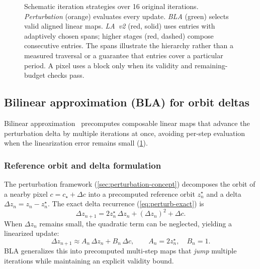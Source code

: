 \begin{figure}[!htbp]
{%
}%
\caption[Iteration skipping: perturbation vs.\ BLA vs.\ LA]{%
  \sloppy
  Schematic iteration strategies over 16 original iterations.
  \emph{Perturbation} (orange) evaluates every update.
  \emph{BLA} (green) selects valid aligned linear maps.
  \emph{LA~v2} (red, solid) uses entries with adaptively chosen spans;
  higher stages (red, dashed) compose consecutive entries.
  The spans illustrate the hierarchy rather than a measured traversal
  or a guarantee that entries cover a particular period. A pixel uses
  a block only when its validity and remaining-budget checks pass.}
\label{fig:approx-skipping}
\end{figure}

\subsection{Bilinear approximation (BLA) for orbit deltas}
\label{sec:bilinear-approx}

Bilinear approximation~\cite{Imagina,Thompson2023BLA} precomputes composable linear
maps that advance the perturbation delta by multiple iterations at once,
avoiding per-step evaluation when the linearization error remains small
(\cref{fig:approx-skipping}).

\subsubsection{Reference orbit and delta formulation}
The perturbation framework (\cref{sec:perturbation-concept}) decomposes
the orbit of a nearby pixel \(c = c_\star + \Delta c\) into a
precomputed reference orbit \(z_n^\star\) and a delta
\(\Delta z_n = z_n - z_n^\star\).  The exact delta recurrence
(\cref{eq:perturb-exact}) is
\[
\Delta z_{n+1} = 2z_n^\star\,\Delta z_n + (\Delta z_n)^2 + \Delta c.
\]
When \(\Delta z_n\) remains small, the quadratic term can be neglected,
yielding a linearized update:
\begin{equation}
\Delta z_{n+1} \approx A_n\,\Delta z_n + B_n\,\Delta c,\qquad
A_n = 2z_n^\star,\quad B_n = 1.
\end{equation}
BLA generalizes this into precomputed multi-step maps that \emph{jump} multiple
iterations while maintaining an explicit validity bound.

